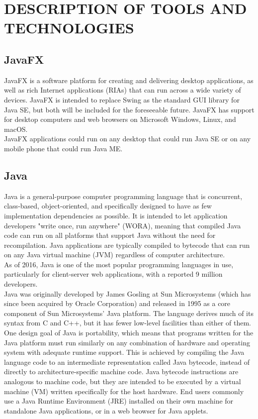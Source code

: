 \chapter{DESCRIPTION OF TOOLS AND TECHNOLOGIES}

\section{JavaFX}
JavaFX is a software platform for creating and delivering desktop applications, as well as rich Internet applications (RIAs) that can run across a wide variety of devices. JavaFX is intended to replace Swing as the standard GUI library for Java SE, but both will be included for the foreseeable future. JavaFX has support for desktop computers and web browsers on Microsoft Windows, Linux, and macOS.\\

JavaFX applications could run on any desktop that could run Java SE or on any mobile phone that could run Java ME.

\thispagestyle{fancy}

\section{Java}
Java is a general-purpose computer programming language that is concurrent,
class-based, object-oriented, and specifically designed to have as few implementation dependencies as possible. It is intended to let application developers "write once, run anywhere" (WORA), meaning that compiled Java code can run on all platforms that support Java without the need for recompilation. Java applications are typically compiled to bytecode that can run on any Java virtual machine (JVM) regardless of computer architecture.\\

As of 2016, Java is one of the most popular programming languages in use, particularly for client-server web applications, with a reported 9 million developers.\\

Java was originally developed by James Gosling at Sun Microsystems (which has since been acquired by Oracle Corporation) and released in 1995 as a core component of Sun Microsystems' Java platform. The language derives much of its syntax from C and C++, but it has fewer low-level facilities
than either of them.\\

One design goal of Java is portability, which means that programs written for the Java platform must run similarly on any combination of hardware and operating system with adequate runtime support. This is achieved by compiling the Java language code to an intermediate representation called Java bytecode, instead of directly to architecture-specific
machine code. Java bytecode instructions are analogous to machine code, but they are intended to be executed by a virtual machine (VM) written specifically for the host hardware. End users commonly use a Java Runtime Environment (JRE) installed on their own machine for standalone Java applications, or in a web browser for Java applets.

